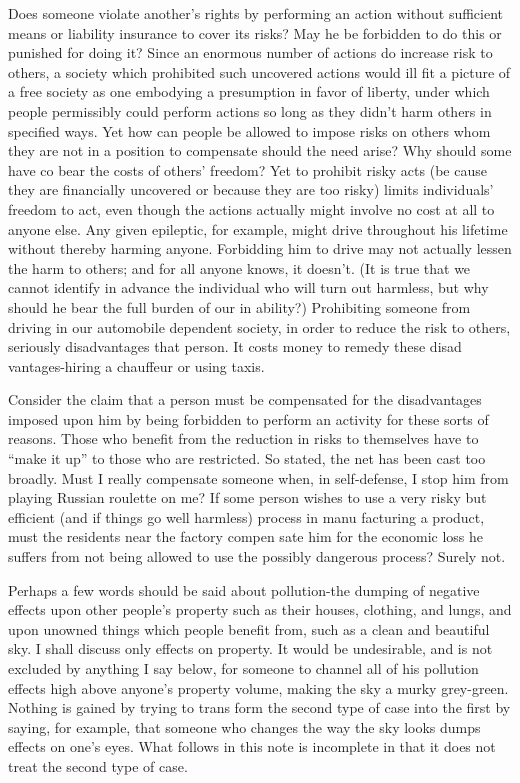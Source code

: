 \documentclass[11pt,openany]{book}
\begin{document}
Does someone violate another's rights by performing an action without sufficient means or liability insurance to cover its risks? May he be forbidden to do this or punished for doing it? Since an enormous number of actions do increase risk to others, a society which prohibited such uncovered actions would ill fit a picture of a free society as one embodying a presumption in favor of liberty, under which people permissibly could perform actions so long as they didn't harm others in specified ways. Yet how can people be allowed to impose risks on others whom they are not in a position to compensate should the need arise? Why should some have co bear the costs of others' freedom? Yet to prohibit risky acts (be cause they are financially uncovered or because they are too risky) limits individuals' freedom to act, even though the actions actually might involve no cost at all to anyone else. Any given epileptic, for example, might drive throughout his lifetime without thereby harming anyone. Forbidding him to drive may not actually lessen the harm to others; and for all anyone knows, it doesn't. (It is true that we cannot identify in advance the individual who will turn out harmless, but why should he bear the full burden of our in ability?) Prohibiting someone from driving in our automobile dependent society, in order to reduce the risk to others, seriously disadvantages that person. It costs money to remedy these disad vantages-hiring a chauffeur or using taxis. 

Consider the claim that a person must be compensated for the disadvantages imposed upon him by being forbidden to perform an activity for these sorts of reasons. Those who benefit from the reduction in risks to themselves have to ``make it up'' to those who are restricted. So stated, the net has been cast too broadly. Must I really compensate someone when, in self-defense, I stop him from playing Russian roulette on me? If some person wishes to use a very risky but efficient (and if things go well harmless) process in manu facturing a product, must the residents near the factory compen sate him for the economic loss he suffers from not being allowed to use the possibly dangerous process? Surely not. 

Perhaps a few words should be said about pollution-the dumping of negative effects upon other people's property such as their houses, clothing, and lungs, and upon unowned things which people benefit from, such as a clean and beautiful sky. I shall discuss only effects on property. It would be undesirable, and is not excluded by anything I say below, for someone to channel all of his pollution effects high above anyone's property volume, making the sky a murky grey-green. Nothing is gained by trying to trans form the second type of case into the first by saying, for example, that someone who changes the way the sky looks dumps effects on one's eyes. What follows in this note is incomplete in that it does not treat the second type of case. 
\end{document}
